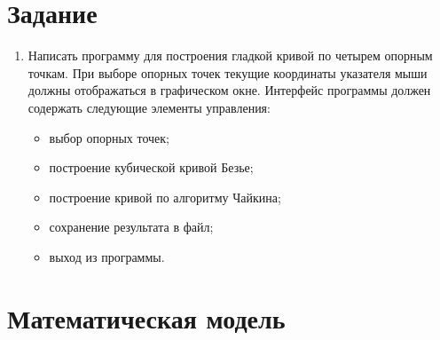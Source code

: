 \documentclass[14pt, a4paper]{extreport}
\begin{document}
\author{Алиев~Э.Ф.}
\maketitle

\chapter{Задание}

\begin{enumerate}

	\item
	Написать программу для построения гладкой кривой по четырем опорным точкам. При выборе опорных точек текущие координаты указателя мыши 	должны отображаться в графическом окне. Интерфейс программы должен содержать следующие элементы управления:
	\begin{itemize}
		\item выбор опорных точек;
		\item построение кубической кривой Безье;
		\item построение кривой по алгоритму Чайкина;
		\item сохранение результата в файл;
		\item выход из программы.
	\end{itemize}

\end{enumerate}

\chapter{Математическая модель}
\end{document}

